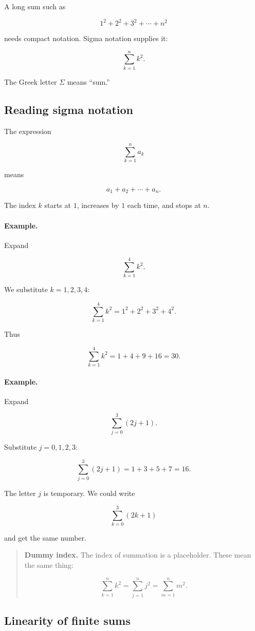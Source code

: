 A long sum such as

\[
1^2+2^2+3^2+\cdots+n^2
\]

needs compact notation.  Sigma notation supplies it:

\[
\sum_{k=1}^n k^2.
\]

The Greek letter \(\Sigma\) means ``sum.''

\subsection{Reading sigma notation}
\label{appsubsec:reading-sigma}

The expression

\[
\sum_{k=1}^n a_k
\]

means

\[
a_1+a_2+\cdots+a_n.
\]

The index \(k\) starts at \(1\), increases by \(1\) each time, and stops at \(n\).

\paragraph{Example.}
Expand

\[
\sum_{k=1}^4 k^2.
\]

We substitute \(k=1,2,3,4\):

\[
\sum_{k=1}^4 k^2
=
1^2+2^2+3^2+4^2.
\]

Thus

\[
\sum_{k=1}^4 k^2
=
1+4+9+16=30.
\]

\paragraph{Example.}
Expand

\[
\sum_{j=0}^3 (2j+1).
\]

Substitute \(j=0,1,2,3\):

\[
\sum_{j=0}^3 (2j+1)
=
1+3+5+7=16.
\]

The letter \(j\) is temporary.  We could write

\[
\sum_{k=0}^3 (2k+1)
\]

and get the same number.

\begin{quote}
\textbf{Dummy index.}
The index of summation is a placeholder.  These mean the same thing:

\[
\sum_{k=1}^n k^2
=
\sum_{j=1}^n j^2
=
\sum_{m=1}^n m^2.
\]
\end{quote}

\subsection{Linearity of finite sums}
\label{appsubsec:linearity-finite-sums}


